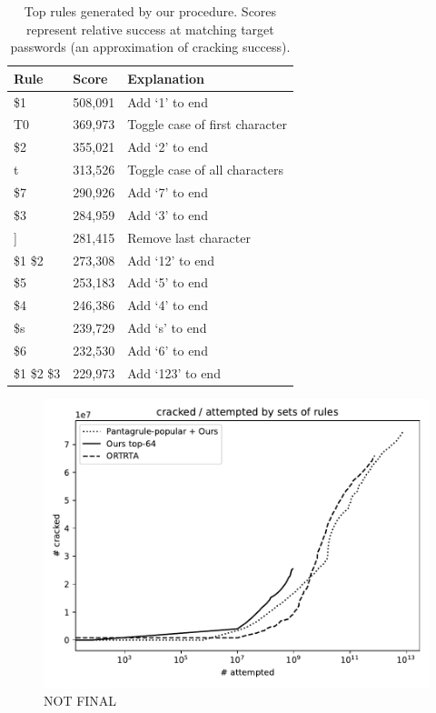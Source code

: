 \documentclass[letterpaper,twocolumn,10pt]{article}
\begin{document}
\begin{table}
\centering
\begin{tabular}{|l|l|l|}
\hline
Rule & Score & Explanation \\
\hline
\$1 & 508,091 & Add `1' to end \\
T0 & 369,973 & Toggle case of first character \\
\$2 & 355,021 & Add `2' to end \\
t & 313,526 & Toggle case of all characters \\
\$7 & 290,926 & Add `7' to end \\
\$3 & 284,959 & Add `3' to end \\
] & 281,415 & Remove last character \\
\$1 \$2 & 273,308 & Add `12' to end \\
\$5 & 253,183 & Add `5' to end \\
\$4 & 246,386 & Add `4' to end \\
\$s & 239,729 & Add `s' to end \\
\$6 & 232,530 & Add `6' to end \\
\$1 \$2 \$3 & 229,973 & Add `123' to end \\
\hline
\end{tabular}
\caption{Top rules generated by our procedure. Scores represent relative
success at matching target passwords (an approximation of cracking success).}
\label{tab:top_rules}
\end{table}


\begin{figure}[h]
    \includegraphics[width=\linewidth]
    {../cracked_attempted_plot_37b49980-a79a-11ed-8986-005056c00001.pdf}
    \caption{NOT FINAL}
    \label{fig:cracked-attempted}
\end{figure}
\end{document}
